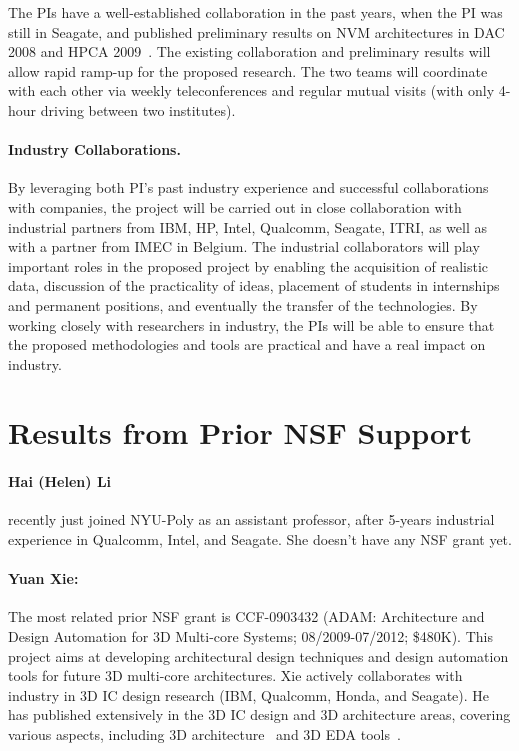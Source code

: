 The PIs have a well-established collaboration in the past years,
when the PI was still in Seagate,  and published preliminary results
on NVM architectures in DAC 2008 and HPCA 2009~\cite{XIE:HPCA09,Xie:dac08}. The existing collaboration
and preliminary results will allow rapid ramp-up for the proposed
research. The two teams will coordinate with each other via weekly
teleconferences and regular mutual visits (with only 4-hour driving between
two institutes).

\paragraph{\textbf{Industry Collaborations.}} By leveraging both PI's past industry experience and successful collaborations with companies, the project will be carried out in close collaboration with
industrial partners from IBM, HP, Intel, Qualcomm, Seagate, ITRI, as well as with
a partner from IMEC in Belgium.
The industrial collaborators will play important roles in the
proposed project by enabling the acquisition of realistic data,
discussion of the practicality of ideas, placement of students in
internships and permanent positions, and eventually the transfer of
the technologies. By working closely with researchers in industry,
the PIs will be able to ensure that the proposed methodologies and
tools are practical and have a real impact on industry.


\section{Results
from Prior NSF Support} \label{sec:prior}

\paragraph{Hai (Helen) Li} recently just joined NYU-Poly as an assistant
professor, after 5-years industrial experience in Qualcomm, Intel,
 and Seagate. She doesn't have any NSF grant yet.

\paragraph{\textbf{Yuan Xie:}} The most related prior NSF grant is
CCF-0903432 (ADAM: Architecture and Design Automation for 3D
Multi-core Systems; 08/2009-07/2012; \$480K). This project aims at
developing architectural design techniques and design automation
tools for future 3D multi-core architectures.
Xie actively collaborates with industry in 3D IC design research
(IBM, Qualcomm, Honda, and Seagate). He has published extensively in
the 3D IC design and 3D architecture areas, covering various aspects, including 3D
architecture~\cite{Xie:MTDT09,XIE:ASPDAC09-3D,XIE:HPCA09,Xie:dac08,xie:isca08,Xie:ISCA09,xie:isca06,xie:iccd05-3d,3D:LXB07,xie:tutorial-micro06} and
3D EDA
tools~\cite{XIE:ASPDAC2009-3Dcost,xie:iccd07-3d,XIE:ICCD08-3D,xie:isqed06-3d,xie:aspdac06,XIE:TVLSI2008-3DCacti,xie:iccd05-3d,xie:jetcs06}.


